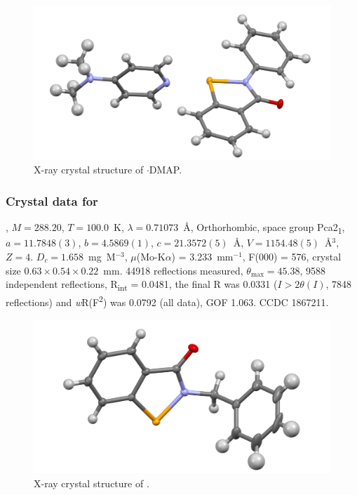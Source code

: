 \begin{refsection}
    \begin{figure}
      \includegraphics[width=0.6\linewidth]{Figures/ebs-dmap-xtal.pdf}
      \caption{X-ray crystal structure of \texorpdfstring{$ \cdot $DMAP}{C20H19N3OSe}.}
    \end{figure}
    
    \subsubsection{Crystal data for \texorpdfstring{}{C14H11NOSe}}
    , $M=288.20$, $T=100.0$~K, $ \lambda=0.71073 $~\AA, Orthorhombic, space group Pca2\textsubscript{1}, $a = 11.7848(3)$, $b = 4.5869(1)$, $c = 21.3572(5)$~\AA, $V = 1154.48(5)$~\AA$^{3}$, $Z = 4$.
    $D_{c}= 1.658$~mg~M$^{-3}$, $\mu$(Mo-K$\alpha$) = 3.233~mm$^{-1}$, F(000) = 576, crystal size $0.63 \times 0.54 \times 0.22$~mm.
    44918 reflections measured, $\theta_{\max}=45.38$\degree, 9588 independent reflections, R\textsubscript{int} = 0.0481, the final R was 0.0331 ($I > 2\theta(I)$, 7848 reflections) and \textit{w}R(F\textsuperscript{2}) was 0.0792 (all data), GOF 1.063.
    CCDC 1867211.
    
    \begin{figure}
      \includegraphics[width=0.6\linewidth]{Figures/ebs-bn-xtal.pdf}
      \caption{X-ray crystal structure of \texorpdfstring{}{C14H11NOSe}.}
    \end{figure}
    

\end{refsection}
